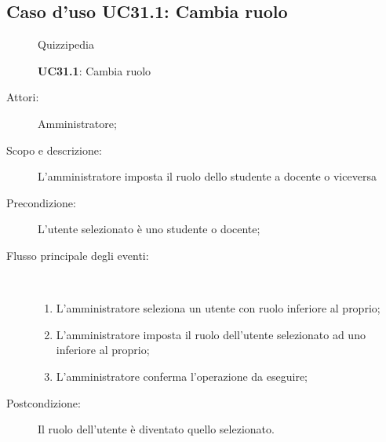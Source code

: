 \subsection{Caso d'uso UC31.1: Cambia ruolo}
	\begin{figure}[H]
		\centering
		\begin{resizedtikzpicture}{\textwidth}
		\begin{umlsystem}[x=0, fill=lightgray!20]{Quizzipedia}
		\end{umlsystem}
		\end{resizedtikzpicture}
		\caption{\textbf{UC31.1}: Cambia ruolo}
		\label{UC31.1}
	\end{figure}
\begin{description}
\item[Attori:] Amministratore;
\item[Scopo e descrizione:] L'amministratore imposta il ruolo dello studente a docente o viceversa
      \item[Precondizione:] L'utente selezionato è uno studente o docente;

        \item[Flusso principale degli eventi:] \ 
 \begin{enumerate}
          \item L'amministratore seleziona un utente con ruolo inferiore al proprio;
          \item L'amministratore imposta il ruolo dell'utente selezionato ad uno inferiore al proprio;
          \item L'amministratore conferma l'operazione da eseguire;

      \end{enumerate}
    \item[Postcondizione:] Il ruolo dell'utente è diventato quello selezionato.
  \end{description}
\hypertarget{UC31.2}{}
